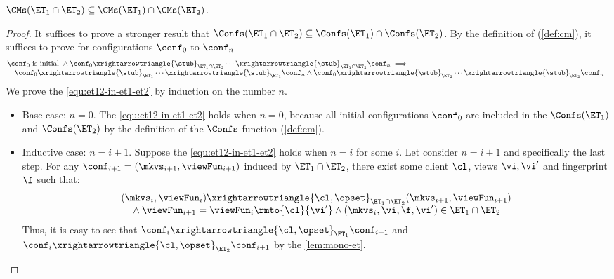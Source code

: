 \begin{lemma}
\label{lem:et12-in-et1-et2}
\( \CMs(\ET_{1} \cap \ET_{2}) \subseteq \CMs(\ET_1) \cap \CMs(\ET_2) \).
\end{lemma}
\begin{proof}
It suffices to prove a stronger result that \( \Confs(\ET_{1} \cap \ET_{2}) \subseteq \Confs(\ET_1) \cap \Confs(\ET_2) \).
By the definition of \Confs (\cref{def:cm}), it suffices to prove for configurations \( \conf_0 \) to \( \conf_n \) 
\begin{equation}
    \label{equ:et12-in-et1-et2}
    \begin{array}{@{}l}
    \conf_0 \text{ is initial } 
    \land \conf_0 \xrightarrowtriangle{\stub}_{\ET_1 \cap \ET_2} \cdots \xrightarrowtriangle{\stub}_{\ET_1 \cap \ET_2} \conf_n \implies {} \\
    \quad \conf_0 \xrightarrowtriangle{\stub}_{\ET_{1}} \cdots \xrightarrowtriangle{\stub}_{\ET_{1}} \conf_n \land \conf_0 \xrightarrowtriangle{\stub}_{\ET_{2}} \cdots \xrightarrowtriangle{\stub}_{\ET_{2}} \conf_n 
    \end{array}
\end{equation}
We prove the \cref{equ:et12-in-et1-et2} by induction on the number \( n \).
\begin{itemize}
\item Base case: \(n = 0\). 
The \cref{equ:et12-in-et1-et2} holds when \( n = 0 \), because all initial configurations \( \conf_0 \) are included in the \( \Confs(\ET_1)\) and \( \Confs(\ET_2) \) by the definition of the \( \Confs \) function (\cref{def:cm}).

\item Inductive case: \(n = i+1\). Suppose the \cref{equ:et12-in-et1-et2} holds when \( n = i \) for some \( i \).
Let consider \( n = i + 1 \) and specifically the last step.
For any \( \conf_{i+1} = (\mkvs_{i+1}, \viewFun_{i+1}) \) induced by \( \ET_{1} \cap \ET_2 \), 
there exist some client \( \cl \), views \( \vi, \vi' \) and fingerprint \( \f \) such that:
\[
    \begin{array}{l}
    (\mkvs_i, \viewFun_i) \xrightarrowtriangle{\cl, \opset}_{\ET_{1} \cap \ET_{2}} (\mkvs_{i+1}, \viewFun_{i+1}) \\
    \quad {} \land \viewFun_{i+1} = \viewFun_{i}\rmto{\cl}{\vi'} \land (\mkvs_i, \vi, \f, \vi' ) \in \ET_{1} \cap \ET_{2}
    \end{array}
\]
Thus, it is easy to see that \( \conf_i \xrightarrowtriangle{\cl, \opset}_{\ET_{1}} \conf_{i+1} \) and \( \conf_i \xrightarrowtriangle{\cl, \opset}_{\ET_{2}} \conf_{i+1} \) by the \cref{lem:mono-et}.
\end{itemize}
\end{proof}

